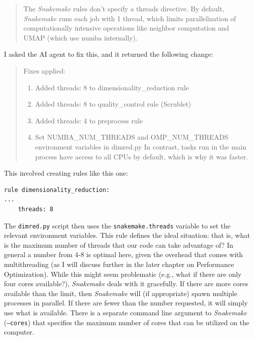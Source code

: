 \begin{quote}
The \textit{Snakemake} rules don't specify a threads directive. By default, \textit{Snakemake} runs each job with 1 thread, which limits parallelization of computationally intensive operations like neighbor computation and UMAP (which use numba internally).
\end{quote}

I asked the AI agent to fix this, and it returned the following change:

\begin{quote}
Fixes applied:

\begin{enumerate}
\item Added threads: 8 to dimensionality\_reduction rule
\item Added threads: 8 to quality\_control rule (Scrublet)
\item Added threads: 4 to preprocess rule
\item Set NUMBA\_NUM\_THREADS and OMP\_NUM\_THREADS environment variables in dimred.py
In contrast, tasks run in the main process have access to all CPUs by default, which is why it was faster.
\end{enumerate}
\end{quote}

This involved creating rules like this one:

\begin{lstlisting}[style=Pythonshort]
rule dimensionality_reduction:
...
    threads: 8
\end{lstlisting}

The \texttt{dimred.py} script then uses the \texttt{snakemake.threads} variable to set the relevant environment variables. This rule defines the ideal situation: that is, what is the maximum number of threads that our code can take advantage of?  In general a number from 4-8 is optimal here, given the overhead that comes with multithreading (as I will discuss further in the later chapter on Performance Optimization).  While this might seem problematic (e.g., what if there are only four cores available?), \textit{Snakemake} deals with it gracefully.  If there are more cores available than the limit, then \textit{Snakemake} will (if appropriate) spawn multiple processes in parallel. If there are fewer than the number requested, it will simply use what is available. There is a separate command line argument to \textit{Snakemake} (\texttt{--cores}) that specifies the maximum number of cores that can be utilized on the computer.

